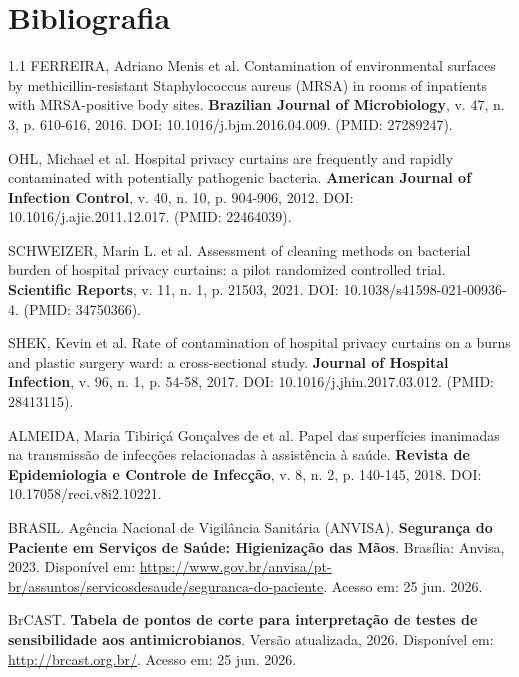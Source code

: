 \documentclass[12pt,a4paper]{article}
\begin{document}
\section{Bibliografia}
\begin{spacing}{1.1}
\noindent FERREIRA, Adriano Menis et al. Contamination of environmental surfaces by methicillin-resistant Staphylococcus aureus (MRSA) in rooms of inpatients with MRSA-positive body sites. \textbf{Brazilian Journal of Microbiology}, v. 47, n. 3, p. 610-616, 2016. DOI: 10.1016/j.bjm.2016.04.009. (PMID: 27289247).

\vspace{12pt}
\noindent OHL, Michael et al. Hospital privacy curtains are frequently and rapidly contaminated with potentially pathogenic bacteria. \textbf{American Journal of Infection Control}, v. 40, n. 10, p. 904-906, 2012. DOI: 10.1016/j.ajic.2011.12.017. (PMID: 22464039).

\vspace{12pt}
\noindent SCHWEIZER, Marin L. et al. Assessment of cleaning methods on bacterial burden of hospital privacy curtains: a pilot randomized controlled trial. \textbf{Scientific Reports}, v. 11, n. 1, p. 21503, 2021. DOI: 10.1038/s41598-021-00936-4. (PMID: 34750366).

\vspace{12pt}
\noindent SHEK, Kevin et al. Rate of contamination of hospital privacy curtains on a burns and plastic surgery ward: a cross-sectional study. \textbf{Journal of Hospital Infection}, v. 96, n. 1, p. 54-58, 2017. DOI: 10.1016/j.jhin.2017.03.012. (PMID: 28413115).

\vspace{12pt}
\noindent ALMEIDA, Maria Tibiriçá Gonçalves de et al. Papel das superfícies inanimadas na transmissão de infecções relacionadas à assistência à saúde. \textbf{Revista de Epidemiologia e Controle de Infecção}, v. 8, n. 2, p. 140-145, 2018. DOI: 10.17058/reci.v8i2.10221.

\vspace{12pt}
\noindent BRASIL. Agência Nacional de Vigilância Sanitária (ANVISA). \textbf{Segurança do Paciente em Serviços de Saúde: Higienização das Mãos}. Brasília: Anvisa, 2023. Disponível em: \url{https://www.gov.br/anvisa/pt-br/assuntos/servicosdesaude/seguranca-do-paciente}. Acesso em: 25 jun. 2026.

\vspace{12pt}
\noindent BrCAST. \textbf{Tabela de pontos de corte para interpretação de testes de sensibilidade aos antimicrobianos}. Versão atualizada, 2026. Disponível em: \url{http://brcast.org.br/}. Acesso em: 25 jun. 2026.


\end{spacing}
\end{document}
